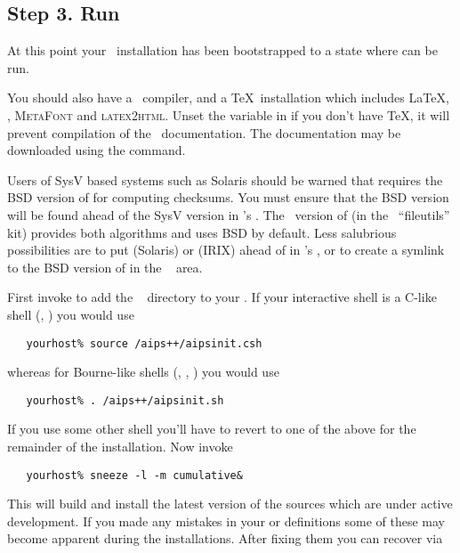 \subsection*{Step 3. Run }

At this point your \aipspp\ installation has been bootstrapped to a state
where  can be run.

You should also have a \cplusplus\ compiler, and a \TeX\ installation which
includes \LaTeX, , \textsc{MetaFont} and \textsc{latex2html}.
Unset the  variable in  if you
don't have \TeX, it will prevent compilation of the \aipspp\ documentation.
The documentation may be downloaded using the  command.

Users of SysV based systems such as Solaris should be warned that
 requires the BSD version of  for computing
checksums.  You must ensure that the BSD version will be found ahead of the
SysV version in 's .  The \gnu\ version of
 (in the \gnu\ ``fileutils'' kit) provides both algorithms and
uses BSD by default.  Less salubrious possibilities are to put 
(Solaris) or  (IRIX) ahead of  in
's , or to create a symlink to the BSD version of
 in the \aipspp\  area.  

First invoke  to add the \aipspp\  directory to
your .  If your interactive shell is a C-like shell (,
) you would use

\begin{verbatim}
   yourhost% source /aips++/aipsinit.csh
\end{verbatim}

\noindent
whereas for Bourne-like shells (, , )
you would use

\begin{verbatim}
   yourhost% . /aips++/aipsinit.sh
\end{verbatim}

\noindent
If you use some other shell you'll have to revert to one of the above for the
remainder of the installation.  Now invoke 

\begin{verbatim}
   yourhost% sneeze -l -m cumulative&
\end{verbatim}

\noindent
This will build and install
the latest version of the sources which are under active development.  If you
made any mistakes in your  or  definitions some of
these may become apparent during the installations.  After fixing them you can
recover via

